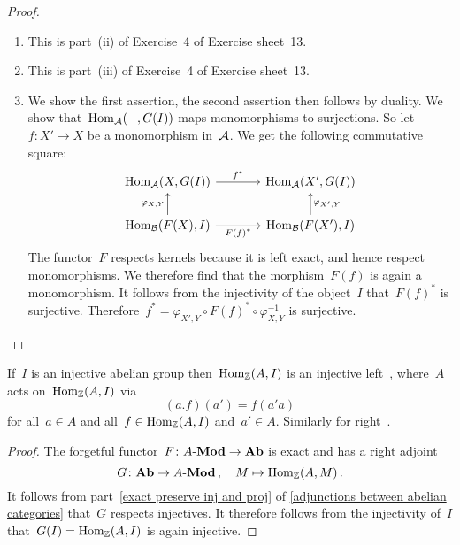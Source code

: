 \begin{proof}
  \leavevmode
  \begin{enumerate}
    \item
      This is part~(ii) of Exercise~4 of Exercise sheet~13.
    \item
      This is part~(iii) of Exercise~4 of Exercise sheet~13.
    \item
      We show the first assertion, the second assertion then follows by duality.
      We show that~$\operatorname{Hom}_{\mathcal{A}}(-,G(I))$ maps monomorphisms to surjections.
      So let~$f \colon X' \to X$ be a monomorphism in~$\mathcal{A}$.
      We get the following commutative square:
      \[
        \begin{tikzcd}[column sep = large]
            \Hom_\Acat(X, G(I))
            \arrow{r}[above]{f^*}
          & \Hom_\Acat(X', G(I))
          \\
            \Hom_\Bcat(F(X), I)
            \arrow{u}[left]{\varphi_{X,Y}}
            \arrow{r}[below]{F(f)^*}
          & \Hom_\Bcat(F(X'), I)
            \arrow{u}[right]{\varphi_{X',Y}}
        \end{tikzcd}
      \]
      The functor~$F$ respects kernels because it is left exact, and hence respect monomorphisms.
      We therefore find that the morphism~$F(f)$ is again a monomorphism.
      It follows from the injectivity of the object~$I$ that~$F(f)^*$ is surjective.
      Therefore~$f^* = \varphi_{X', Y} \circ F(f)^* \circ \varphi_{X,Y}^{-1}$ is surjective.
    \qedhere
  \end{enumerate}
\end{proof}


\begin{corollary}
  If~$I$ is an injective abelian group then~$\operatorname{Hom}_{\mathbb{Z}}(A,I)$ is an injective left~{}, where~$A$ acts on~$\operatorname{Hom}_{\mathbb{Z}}(A,I)$ via
  \[
    (a.f)(a')
    =
    f(a' a)
  \]
  for all~$a \in A$ and all~$f \in \operatorname{Hom}_{\mathbb{Z}}(A,I)$ and~$a' \in A$.
  Similarly for right~{}.
\end{corollary}


\begin{proof}
  The forgetful functor~$F \colon \text{$A$-$\mathbf{Mod}$} \to \mathbf{Ab}$ is exact and has a right adjoint
  \[
    G
    \colon
    \mathbf{Ab}
    \to
    \text{$A$-$\mathbf{Mod}$} \,,
    \quad
    M
    \mapsto
    \operatorname{Hom}_{\mathbb{Z}}(A,M)  \,.
  \]
  It follows from part~\ref*{exact preserve inj and proj} of \cref{adjunctions between abelian categories} that~$G$ respects injectives.
  It therefore follows from the injectivity of~$I$ that~$G(I) = \operatorname{Hom}_{\mathbb{Z}}(A,I)$ is again injective.
\end{proof}


